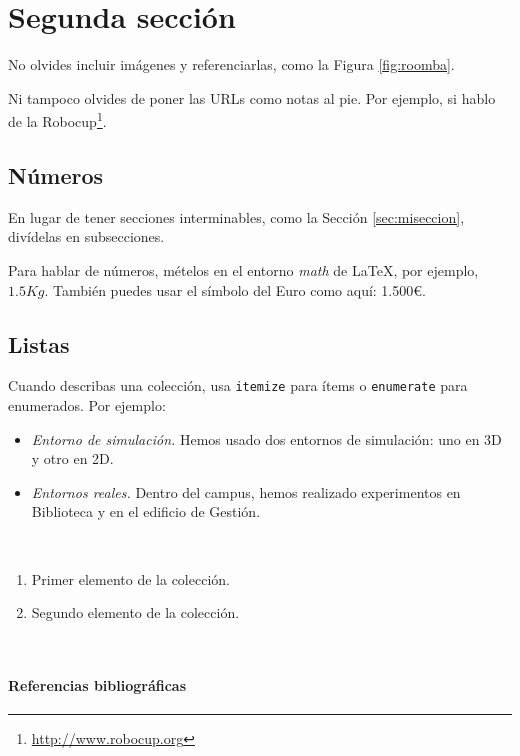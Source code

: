 \section{Segunda sección}
\label{sec:segundaseccion}

No olvides incluir imágenes y referenciarlas, como la Figura \ref{fig:roomba}.

Ni tampoco olvides de poner las URLs como notas al pie. Por ejemplo, si hablo de la Robocup\footnote{\url{http://www.robocup.org}}.

\subsection{Números}
\label{sec:subseccion}

En lugar de tener secciones interminables, como la Sección \ref{sec:miseccion}, divídelas en subsecciones.

Para hablar de números, mételos en el entorno \textit{math} de \LaTeX, por ejemplo, $1.5Kg$. También puedes usar el símbolo del Euro como aquí: 1.500\euro.

\subsection{Listas}

Cuando describas una colección, usa \texttt{itemize} para ítems o \texttt{enumerate} para enumerados. Por ejemplo:

\begin{itemize}
 \item \textit{Entorno de simulación.} Hemos usado dos entornos de simulación: uno en 3D y otro en 2D.
 \item \textit{Entornos reales.} Dentro del campus, hemos realizado experimentos en Biblioteca y en el edificio de Gestión.
\end{itemize}\

\begin{enumerate}
 \item Primer elemento de la colección.
 \item Segundo elemento de la colección.
\end{enumerate}\

\paragraph{Referencias bibliográficas}
\label{sec:referencias}


